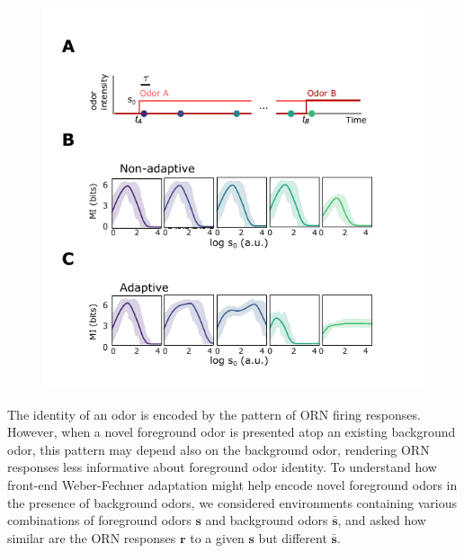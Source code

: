 \documentclass[9pt,lineno]{elife}
\begin{document}
\begin{figure}
\begin{fullwidth}
{		}
		{\includegraphics[width=0.85\linewidth]{figure2_supp2}}
		\label{figsupp:SI_MI}
	\end{fullwidth}
\end{figure}

The identity of an odor is encoded by the pattern of ORN firing responses. However, when a novel foreground odor is presented atop an existing background odor, this pattern may depend also on the background odor, rendering ORN responses less informative about foreground odor identity. To understand how front-end Weber-Fechner adaptation might help encode novel foreground odors in the presence of background odors, we considered environments containing various combinations of foreground odors $\mathbf{s}$ and background odors $\bar{\mathbf{s}}$, and asked how similar are the ORN responses $\mathbf r$ to a given $\mathbf{s}$ but different $\bar{\mathbf{s}}$. %
\end{document}
